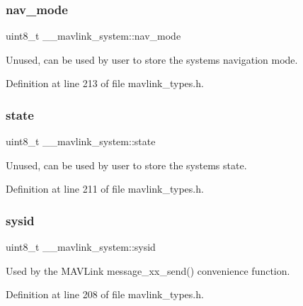 \subsubsection{\texorpdfstring{nav\_mode}{nav\_mode}}
{\footnotesize\ttfamily uint8\+\_\+t \+\_\+\+\_\+mavlink\+\_\+system\+::nav\+\_\+mode}



Unused, can be used by user to store the system\textquotesingle{}s navigation mode. 



Definition at line 213 of file mavlink\+\_\+types.\+h.

\mbox{\label{struct____mavlink__system_ac5afa4a95067ba7b21d4884a740cc413}} 
\subsubsection{\texorpdfstring{state}{state}}
{\footnotesize\ttfamily uint8\+\_\+t \+\_\+\+\_\+mavlink\+\_\+system\+::state}



Unused, can be used by user to store the system\textquotesingle{}s state. 



Definition at line 211 of file mavlink\+\_\+types.\+h.

\mbox{\label{struct____mavlink__system_a3533dcc52fcacb13bb3190ae847e8260}} 
\subsubsection{\texorpdfstring{sysid}{sysid}}
{\footnotesize\ttfamily uint8\+\_\+t \+\_\+\+\_\+mavlink\+\_\+system\+::sysid}



Used by the M\+A\+V\+Link message\+\_\+xx\+\_\+send() convenience function. 



Definition at line 208 of file mavlink\+\_\+types.\+h.

\mbox{\label{struct____mavlink__system_aab94b93e251cac8de298a0ff90c41b8f}} 
